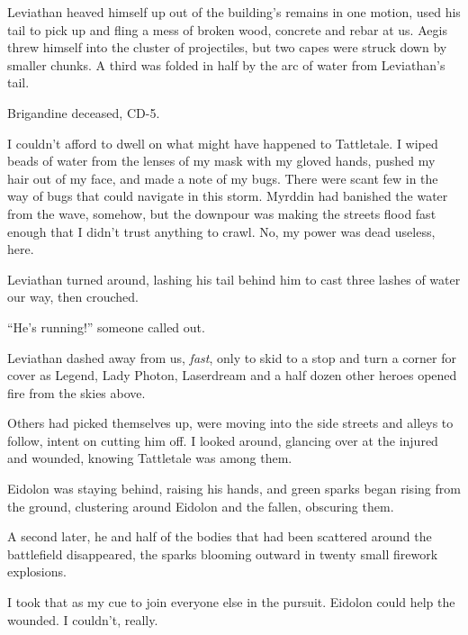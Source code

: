 Leviathan heaved himself up out of the building's remains in one motion, used his tail to pick up and fling a mess of broken wood, concrete and rebar at us.  Aegis threw himself into the cluster of projectiles, but two capes were struck down by smaller chunks.  A third was folded in half by the arc of water from Leviathan's tail.



Brigandine deceased, CD-5.



I couldn't afford to dwell on what might have happened to Tattletale.  I wiped beads of water from the lenses of my mask with my gloved hands, pushed my hair out of my face, and made a note of my bugs.  There were scant few in the way of bugs that could navigate in this storm.  Myrddin had banished the water from the wave, somehow, but the downpour was making the streets flood fast enough that I didn't trust anything to crawl.  No, my power was dead useless, here.



Leviathan turned around, lashing his tail behind him to cast three lashes of water our way, then crouched.



``He's running!'' someone called out.



Leviathan dashed away from us, \emph{fast}, only to skid to a stop and turn a corner for cover as Legend, Lady Photon, Laserdream and a half dozen other heroes opened fire from the skies above.



Others had picked themselves up, were moving into the side streets and alleys to follow, intent on cutting him off.  I looked around, glancing over at the injured and wounded, knowing Tattletale was among them.



Eidolon was staying behind, raising his hands, and green sparks began rising from the ground, clustering around Eidolon and the fallen, obscuring them.



A second later, he and half of the bodies that had been scattered around the battlefield disappeared, the sparks blooming outward in twenty small firework explosions.



I took that as my cue to join everyone else in the pursuit.  Eidolon could help the wounded.  I couldn't, really.



